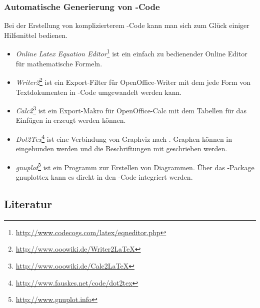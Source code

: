 \subsubsection{Automatische Generierung von \latex-Code}
Bei der Erstellung von komplizierterem \latex-Code kann man sich zum Glück
einiger Hilfsmittel bedienen.

\begin{itemize}
\item \emph{Online Latex Equation
Editor}\footnote{\url{http://www.codecogs.com/latex/eqneditor.php}} ist ein
einfach zu bedienender Online Editor für mathematische Formeln.
\item \emph{Writer2\latex}\footnote{\url{http://www.ooowiki.de/Writer2LaTeX}}
ist ein Export-Filter für OpenOffice-Writer mit dem jede Form von Textdokumenten in
\latex-Code umgewandelt werden kann.
\item \emph{Calc2\latex}\footnote{\url{http://www.ooowiki.de/Calc2LaTeX}} ist
ein Export-Makro für OpenOffice-Calc mit dem Tabellen für das Einfügen in \latex
erzeugt werden können.
\item \emph{Dot2Tex}\footnote{\url{http://www.fauskes.net/code/dot2tex}} ist
eine Verbindung von Graphviz nach \latex. Graphen können in \latex eingebunden werden
und die Beschriftungen mit \latex geschrieben werden.
\item \emph{gnuplot}\footnote{\url{http://www.gnuplot.info}} ist ein Programm
zur Erstellen von Diagrammen. Über das \latex-Package gnuplottex kann es direkt in
den \latex-Code integriert werden.
\end{itemize}


\subsection{Literatur}
\label{sec:literatur}


